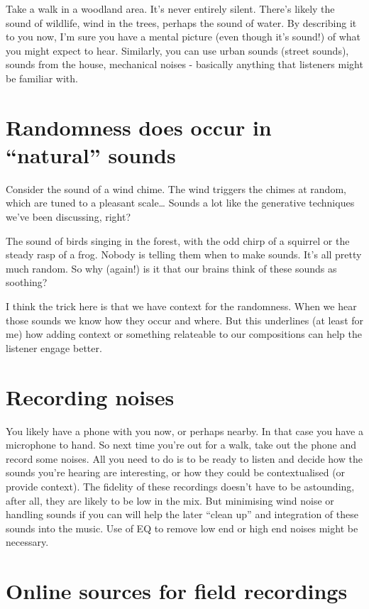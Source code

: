 \documentclass[
  12pt,
  letterpaper,
  oneside,
  open=any]{scrbook}
\begin{document}
Take a walk in a woodland area. It's never entirely silent. There's
likely the sound of wildlife, wind in the trees, perhaps the sound of
water. By describing it to you now, I'm sure you have a mental picture
(even though it's sound!) of what you might expect to hear. Similarly,
you can use urban sounds (street sounds), sounds from the house,
mechanical noises - basically anything that listeners might be familiar
with.

\section{Randomness does occur in ``natural''
sounds}\label{randomness-does-occur-in-natural-sounds}

Consider the sound of a wind chime. The wind triggers the chimes at
random, which are tuned to a pleasant scale\ldots{} Sounds a lot like
the generative techniques we've been discussing, right?

The sound of birds singing in the forest, with the odd chirp of a
squirrel or the steady rasp of a frog. Nobody is telling them when to
make sounds. It's all pretty much random. So why (again!) is it that our
brains think of these sounds as soothing?

I think the trick here is that we have context for the randomness. When
we hear those sounds we know how they occur and where. But this
underlines (at least for me) how adding context or something relateable
to our compositions can help the listener engage better.

\section{Recording noises}\label{recording-noises}

You likely have a phone with you now, or perhaps nearby. In that case
you have a microphone to hand. So next time you're out for a walk, take
out the phone and record some noises. All you need to do is to be ready
to listen and decide how the sounds you're hearing are interesting, or
how they could be contextualised (or provide context). The fidelity of
these recordings doesn't have to be astounding, after all, they are
likely to be low in the mix. But minimising wind noise or handling
sounds if you can will help the later ``clean up'' and integration of
these sounds into the music. Use of EQ to remove low end or high end
noises might be necessary.

\section{Online sources for field
recordings}\label{online-sources-for-field-recordings}
\end{document}

